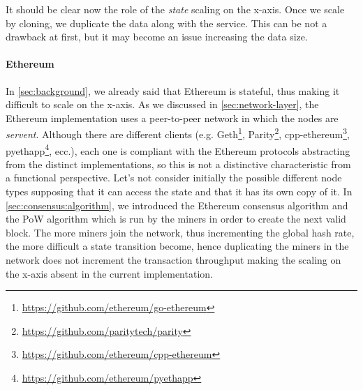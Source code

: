 It should be clear now the role of the \emph{state} scaling on the x-axis. Once
we scale by cloning, we duplicate the data along with the service. This can be
not a drawback at first, but it may become an issue increasing the data size.

\paragraph{Ethereum}
In \autoref{sec:background}, we already said that Ethereum is stateful, thus
making it difficult to scale on the x-axis. As we discussed in
\autoref{sec:network-layer}, the Ethereum implementation uses a peer-to-peer
network in which the nodes are \emph{servent}. Although there are different
clients (e.g. Geth\footnote{\url{https://github.com/ethereum/go-ethereum}},
Parity\footnote{\url{https://github.com/paritytech/parity}},
cpp-ethereum\footnote{\url{https://github.com/ethereum/cpp-ethereum}},
pyethapp\footnote{\url{https://github.com/ethereum/pyethapp}}, ecc.), each one
is compliant with the Ethereum protocols abstracting from the distinct
implementations, so this is not a distinctive characteristic from a functional
perspective. Let's not consider initially the possible different node types
 supposing that it can access the state and that it has its
own copy of it. In \autoref{sec:consensus:algorithm}, we introduced the Ethereum
consensus algorithm and the PoW algorithm which is run by the miners in order to
create the next valid block. The more miners join the network, thus incrementing
the global hash rate, the more difficult a state transition become, hence
duplicating the miners in the network does not increment the transaction
throughput making the scaling on the x-axis absent in the current
implementation.




